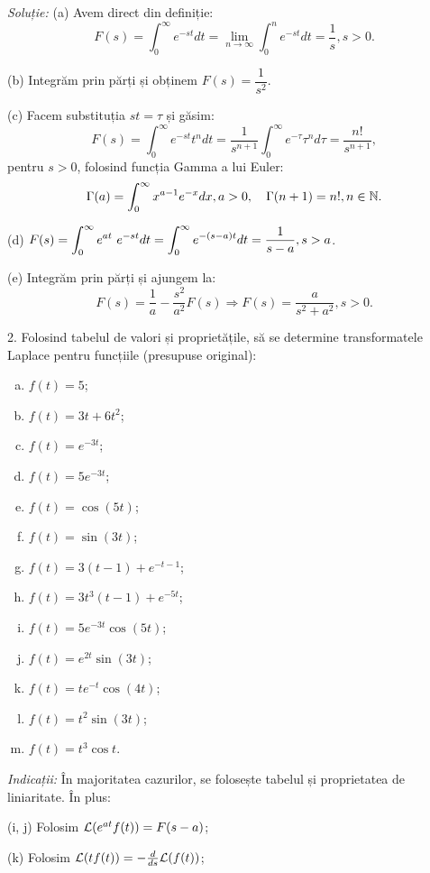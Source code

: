 \emph{Soluție:} (a) Avem direct din definiție:
\[
  F(s) = \int_0^\infty e^{-st} dt = \lim_{n \to \infty} \int_0^n e^{-st} dt = \frac{1}{s}, s > 0.
\]

(b) Integrăm prin părți și obținem $ F(s) = \dfrac{1}{s^2} $.

(c) Facem substituția $ st = \tau $ și găsim:
\[
  F(s) = \int_0^\infty e^{-st} t^n dt = \frac{1}{s^{n+1}} \int_0^\infty e^{-\tau} \tau^n d\tau = %
  \frac{n!}{s^{n+1}},
\]
pentru $ s > 0 $, folosind funcția Gamma a lui Euler:
\[
  \Gamma(a) = \int_0^\infty x^{a-1}e^{-x} dx, a > 0, \quad \Gamma(n + 1) = n!, n \in \mathbb{N}.
\]

(d) $ F(s) = \ds\int_0^\infty e^{at} e^{-st} dt = \ds\int_0^\infty e^{-(s - a)t} dt = %
\dfrac{1}{s-a}, s > a $.

(e) Integrăm prin părți și ajungem la:
\[
  F(s) = \frac{1}{a} - \frac{s^2}{a^2} F(s) \Rightarrow F(s) = \frac{a}{s^2 + a^2}, s > 0.
\]

\vspace{1cm}

2. Folosind tabelul de valori și proprietățile, să se determine transformatele Laplace
pentru funcțiile (presupuse original):
\begin{enumerate}[(a)]
\item $ f(t) = 5 $;
\item $ f(t) = 3t + 6t^2 $;
\item $ f(t) = e^{-3t} $;
\item $ f(t) = 5e^{-3t} $;
\item $ f(t) = \cos (5t) $;
\item $ f(t) = \sin (3t) $;
\item $ f(t) = 3(t-1) + e^{-t-1} $;
\item $ f(t) = 3t^3(t - 1) + e^{-5t} $;
\item $ f(t) = 5e^{-3t} \cos (5t) $;
\item $ f(t) = e^{2t} \sin (3t) $;
\item $ f(t) = te^{-t} \cos (4t) $;
\item $ f(t) = t^2 \sin (3t) $;
\item $ f(t) = t^3 \cos t $.
\end{enumerate}

\emph{Indicații:} În majoritatea cazurilor, se folosește tabelul și proprietatea de liniaritate.
În plus:

(i, j) Folosim $ \mathcal{L} (e^{at} f(t)) = F(s - a) $;

(k) Folosim $ \mathcal{L} (t f(t)) = -\frac{d}{ds} \mathcal{L}(f(t)) $;

